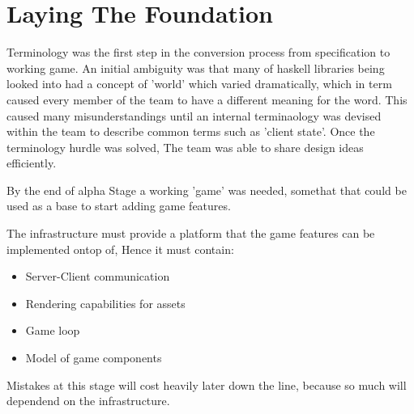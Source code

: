 
\newcommand{\guiLibName}{Sheen}

\begin{comment}
  what to do what to do what to do.
  In this section should talk about what we did for our infrastructure, what decisions we made, what we thought we would need to factor in later on.
  
things to talk about:
  - terminology
  - realizing what was needed for alpha stage.
  - researching libraries that could be used
\end{comment}
    
\section{Laying The Foundation}

Terminology was the first step in the conversion process from specification to working game. 
An initial ambiguity was that many of haskell libraries being looked into had a concept of 'world' which varied dramatically, which in term caused every member of the team to have a different meaning for the word. This caused many misunderstandings until an internal terminaology was devised within the team to describe common terms such as 'client state'. Once the terminology hurdle was solved, The team was able to share design ideas efficiently.

By the end of alpha Stage a working 'game' was needed, somethat that could be used as a base to start adding game features.

The infrastructure must provide a platform that the game features can be implemented ontop of, Hence it must contain:
\begin{itemize}
\item Server-Client communication
\item Rendering capabilities for assets
\item Game loop
\item Model of game components
\end{itemize}

Mistakes at this stage will cost heavily later down the line, because so much will dependend on the infrastructure. 
